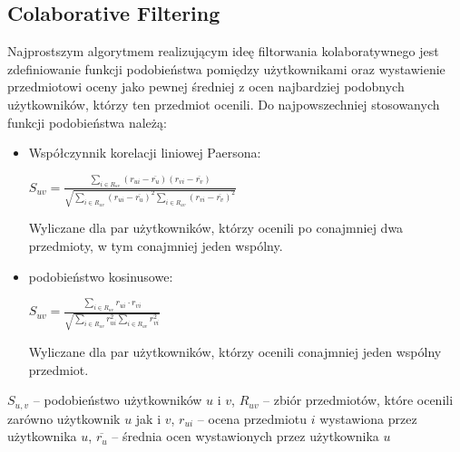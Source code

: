 \documentclass{pracamgr}
\begin{document}
   \subsection{Colaborative Filtering}%
    Najprostszym algorytmem realizującym ideę filtorwania kolaboratywnego jest zdefiniowanie funkcji podobieństwa pomiędzy użytkownikami
    oraz wystawienie przedmiotowi oceny jako pewnej średniej z ocen najbardziej podobnych użytkowników, którzy ten przedmiot ocenili.\newline
    Do najpowszechniej stosowanych funkcji podobieństwa należą:
    \begin{itemize}\itemsep1pt \parskip0pt 
     \item Współczynnik korelacji liniowej Paersona:
      \begin{center}
       $S_{uv}=\frac{\sum\limits_{i\in R_{uv}}(r_{ui}-\overline{r_u})(r_{vi}-\overline{r_v})}
       {\sqrt{\sum\limits_{i\in R_{uv}}(r_{ui}-\overline{r_u})^2\sum\limits_{i\in R_{uv}}(r_{vi}-\overline{r_v})^2}}$
      \end{center}
      Wyliczane dla par użytkowników, którzy ocenili po conajmniej dwa przedmioty, w tym conajmniej jeden wspólny.
     \item podobieństwo kosinusowe:
      \begin{center}
       $S_{uv}=\frac{\sum\limits_{i\in R_{uv}}r_{ui}\cdot r_{vi}}
       {\sqrt{\sum\limits_{i\in R_{uv}}r_{ui}^2\sum\limits_{i\in R_{uv}}r_{vi}^2}}$
      \end{center}
      Wyliczane dla par użytkowników, którzy ocenili conajmniej jeden wspólny przedmiot.
    \end{itemize}
    {\scriptsize
     $S_{u,v}$ -- podobieństwo użytkowników $u$ i $v$, $R_{uv}$ -- zbiór przedmiotów, które ocenili zarówno użytkownik $u$ jak i $v$,\newline
     $r_{ui}$ -- ocena przedmiotu $i$ wystawiona przez użytkownika $u$, $\overline{r_{u}}$ -- średnia ocen wystawionych przez użytkownika $u$
    }\newline
\end{document}
